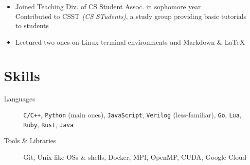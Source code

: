 \documentclass[12pt, a4paper]{article}
\begin{document}
\begin{itemize}
\item Joined Teaching Div. of CS Student Assoc. in sophomore year\\
Contributed to \textsf{CSST} \textit{(CS STudents)}, a study group providing basic tutorials to students
\item Lectured two ones on \textsf{Linux} terminal environments and \textsf{Markdown} \& \LaTeX
\end{itemize}

\section{Skills}

\begin{description}
\item[Languages] \texttt{C/C++}, \texttt{Python} (main ones), \texttt{JavaScript}, \texttt{Verilog} (less-familiar), \texttt{Go}, \texttt{Lua}, \texttt{Ruby}, \texttt{Rust}, \texttt{Java}
\item[Tools \& Libraries] \textsf{Git}, \textsf{Unix}-like OSs \& shells, \textsf{Docker}, \textsf{MPI}, \textsf{OpenMP}, \textsf{CUDA}, Google Cloud
\end{description}
\end{document}
